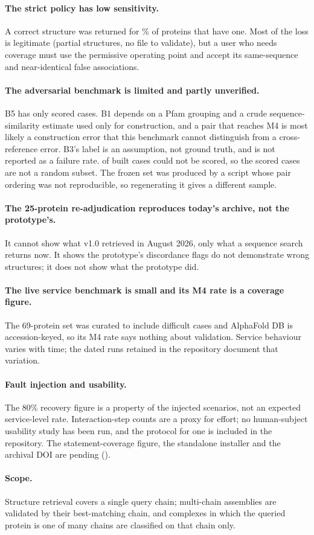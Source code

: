 \paragraph{The strict policy has low sensitivity.} A correct structure was
returned for \% of proteins that have one. Most of the loss is
legitimate (partial structures, no file to validate), but a user who needs
coverage must use the permissive operating point and accept its same-sequence and
near-identical false associations.

\paragraph{The adversarial benchmark is limited and partly unverified.} B5 has only
 scored cases. B1 depends on a Pfam grouping and a crude sequence-similarity
estimate used only for construction, and a pair that reaches M4 is most likely a
construction error that this benchmark cannot distinguish from a cross-reference
error. B3's label is an assumption, not ground truth, and is not reported as a
failure rate.  of  built cases could not be scored,
so the scored cases are not a random subset. The frozen set was produced by a
script whose pair ordering was not reproducible, so regenerating it gives a different sample.

\paragraph{The 25-protein re-adjudication reproduces today's archive, not the
prototype's.} It cannot show what v1.0 retrieved in August 2026, only what a
sequence search returns now. It shows the prototype's discordance flags do not
demonstrate wrong structures; it does not show what the prototype did.

\paragraph{The live service benchmark is small and its M4 rate is a coverage figure.}
The 69-protein set was curated to include difficult cases and AlphaFold DB is
accession-keyed, so its M4 rate says nothing about validation. Service behaviour
varies with time; the dated runs retained in the repository document that variation.

\paragraph{Fault injection and usability.} The 80\% recovery figure is a property
of the injected scenarios, not an expected service-level rate. Interaction-step
counts are a proxy for effort; no human-subject usability study has been run, and
the protocol for one is included in the repository. The statement-coverage figure,
the standalone installer and the archival DOI are pending
().

\paragraph{Scope.} Structure retrieval covers a single query chain; multi-chain
assemblies are validated by their best-matching chain, and complexes in which the
queried protein is one of many chains are classified on that chain only.
